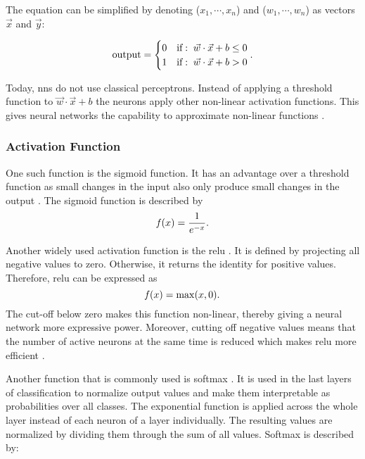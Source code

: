The equation can be simplified by denoting ($x_1, \cdots, x_n$) and ($w_1, \cdots, w_n$) as vectors $\vec{x}$ and $\vec{y}$:

\begin{equation}
    \mathrm{output} = 
    \begin{cases}\label{eq:PerceptronVector}
    0 & \text{if}:\; \vec{w} \cdot \vec{x} + b \le 0 \\
    1 & \text{if}:\; \vec{w} \cdot \vec{x} + b > 0
    \end{cases} \text{.}
\end{equation}

Today, \acp{nn} do not use classical perceptrons. Instead of applying a threshold function to $\vec{w} \cdot \vec{x} + b$ the neurons apply other non-linear activation functions. This gives neural networks the capability to approximate non-linear functions \cite{cybenko1989approximation, hornik1991approximation, sharma2020activation}.

\subsubsection{Activation Function}
\label{sec:Foundations:NeuralNetworks:ActivationFunction}

One such function is the sigmoid function. It has an advantage over a threshold function as small changes in the input also only produce small changes in the output \cite{nielsen2015neural}. The sigmoid function is described by \begin{equation} \operatorname{\mathit{f}}(x) = \frac{1}{e^{-x}} \text{.} \end{equation} 

Another widely used activation function is the \ac{relu} \cite{fukushima1969visual, goodfellow2016deep, nielsen2015neural}. It is defined by projecting all negative values to zero. Otherwise, it returns the identity for positive values. Therefore, \ac{relu} can be expressed as \begin{equation} \operatorname{\mathit{f}}(x)  = \mathrm{max}(x,0) \text{.} \end{equation}
The cut-off below zero makes this function non-linear, thereby giving a neural network more expressive power. Moreover, cutting off negative values means that the number of active neurons at the same time is reduced which makes \ac{relu} more efficient \cite{sharma2020activation}.

Another function that is commonly used is softmax \cite{liu2016computer, goodfellow2016deep}. It is used in the last layers of classification to normalize output values and make them interpretable as probabilities over all classes. The exponential function is applied across the whole layer instead of each neuron of a layer individually. The resulting values are normalized by dividing them through the sum of all values. Softmax is described by:

